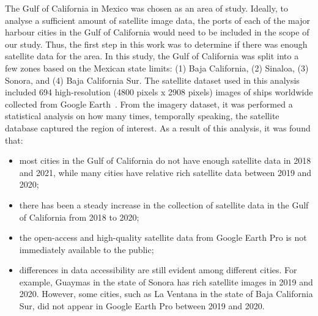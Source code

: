 The Gulf of California in Mexico was chosen as an area of study. Ideally, to analyse a sufficient amount of satellite image data, the ports of each of the major harbour cities in the Gulf of California would need to be included in the scope of our study. Thus, the first step in this work was to determine if there was enough satellite data for the area. In this study, the Gulf of California was split into a few zones based on the Mexican state limits: (1) Baja California, (2) Sinaloa, (3) Sonora, and (4) Baja California Sur. The satellite dataset used in this analysis included 694 high-resolution (4800 pixels x 2908 pixels) images of ships worldwide collected from Google Earth~\cite{lutherborrowship}. From the imagery dataset, it was performed a statistical analysis on how many times, temporally speaking, the satellite database captured the region of interest. As a result of this analysis, it was found that:
\begin{itemize}
    \item most cities in the Gulf of California do not have enough satellite data in 2018 and 2021, while many cities have relative rich satellite data between 2019 and 2020;
    \item there has been a steady increase in the collection of satellite data in the Gulf of California from 2018 to 2020;
    \item the open-access and high-quality satellite data from Google Earth Pro is not immediately available to the public;
    \item differences in data accessibility are still evident among different cities. For example, Guaymas in the state of Sonora has rich satellite images in 2019 and 2020. However, some cities, such as La Ventana in the state of Baja California Sur, did not appear in Google Earth Pro between 2019 and 2020.
\end{itemize}

